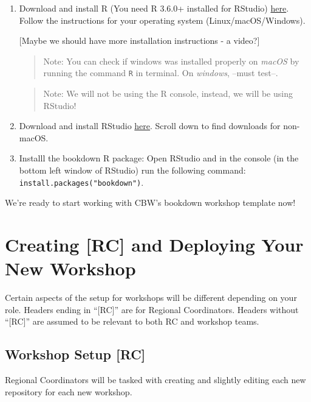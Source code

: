 \documentclass[
]{book}
\theoremstyle{definition}
\theoremstyle{definition}
\theoremstyle{definition}
\theoremstyle{definition}
\theoremstyle{remark}
\begin{document}
\begin{enumerate}
\def\labelenumi{\arabic{enumi}.}
\item
  Download and install R (You need R 3.6.0+ installed for RStudio) \href{https://cran.rstudio.com/}{here}. Follow the instructions for your operating system (Linux/macOS/Windows).

  {[}Maybe we should have more installation instructions - a video?{]}

  \begin{quote}
  Note: You can check if windows was installed properly on \emph{macOS} by running the command \texttt{R} in terminal. On \emph{windows}, --must test--.
  \end{quote}

  \begin{quote}
  Note: We will not be using the R console, instead, we will be using RStudio!
  \end{quote}
\item
  Download and install RStudio \href{https://posit.co/download/rstudio-desktop/\#:~:text=AND\%20INSTALL\%20R-,2\%3A\%20Install\%20RStudio,-DOWNLOAD\%20RSTUDIO\%20DESKTOP}{here}. Scroll down to find downloads for non-macOS.
\item
  Installl the bookdown R package: Open RStudio and in the console (in the bottom left window of RStudio) run the following command: \texttt{install.packages("bookdown")}.
\end{enumerate}

We're ready to start working with CBW's bookdown workshop template now!

\chapter{\texorpdfstring{Creating {[}RC{]} and Deploying Your \textbf{New} Workshop}{Creating {[}RC{]} and Deploying Your New Workshop}}\label{creating-rc-and-deploying-your-new-workshop}

Certain aspects of the setup for workshops will be different depending on your role. Headers ending in ``{[}RC{]}'' are for Regional Coordinators. Headers without ``{[}RC{]}'' are assumed to be relevant to both RC and workshop teams.

\section{Workshop Setup {[}RC{]}}\label{workshop-setup-rc}

Regional Coordinators will be tasked with creating and slightly editing each new repository for each new workshop.
\end{document}

